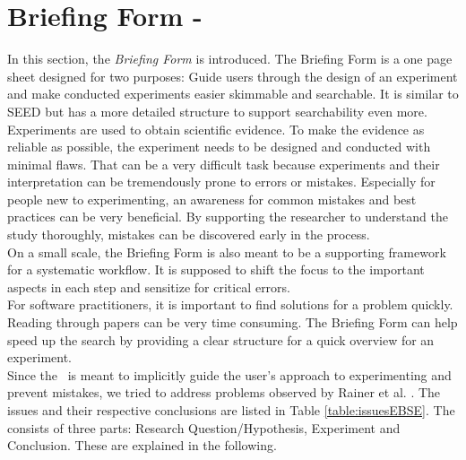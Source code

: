 
\section{Briefing Form - \briefingform}
\label{sec:briefing form}

In this section, the \textit{Briefing Form} is introduced. The Briefing Form is a one page sheet designed for two purposes: Guide users through the design of an experiment and make conducted experiments easier skimmable and searchable. It is similar to SEED but has a more detailed structure to support searchability even more.\\
Experiments are used to obtain scientific evidence. To make the evidence as reliable as possible, the experiment needs to be designed and conducted with minimal flaws. That can be a very difficult task because experiments and their interpretation can be tremendously prone to errors or mistakes. Especially for people new to experimenting, an awareness for common mistakes and best practices can be very beneficial. By supporting the researcher to understand the study thoroughly, mistakes can be discovered early in the process.\\
On a small scale, the Briefing Form is also meant to be a  supporting framework for a systematic workflow. It is supposed to shift the focus to the important aspects in each step and sensitize for critical errors.\\
For software practitioners, it is important to find solutions for a problem quickly. Reading through papers can be very time consuming. The Briefing Form can help speed up the search by providing a clear structure for a quick overview for an experiment.\\
Since the \briefingform~is meant to implicitly guide the user's approach to experimenting and prevent mistakes, we tried to address problems observed  by Rainer et al. \cite{Rainer2006}. The issues and their respective conclusions are listed in Table \ref{table:issuesEBSE}. The \briefingform consists of three parts: Research Question/Hypothesis, Experiment and Conclusion. These are explained in the following.\\


